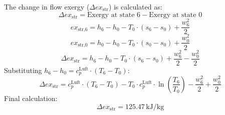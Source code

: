 The change in flow exergy (\( \Delta ex_\text{str} \)) is calculated as:  
\[ \Delta ex_\text{str} = \text{Exergy at state 6} - \text{Exergy at state 0} \]  
\[ ex_\text{str,6} = h_6 - h_0 - T_0 \cdot \left( s_6 - s_0 \right) + \frac{w_6^2}{2} \]  
\[ ex_\text{str,0} = h_0 - h_0 - T_0 \cdot \left( s_0 - s_0 \right) + \frac{w_0^2}{2} \]  
\[ \Delta ex_\text{str} = h_6 - h_0 - T_0 \cdot \left( s_6 - s_0 \right) + \frac{w_6^2}{2} - \frac{w_0^2}{2} \]  
Substituting \( h_6 - h_0 = c_p^\text{Luft} \cdot \left( T_6 - T_0 \right) \):  
\[ \Delta ex_\text{str} = c_p^\text{Luft} \cdot \left( T_6 - T_0 \right) - T_0 \cdot c_p^\text{Luft} \cdot \ln \left( \frac{T_6}{T_0} \right) - \frac{w_6^2}{2} + \frac{w_0^2}{2} \]  
Final calculation:  
\[ \Delta ex_\text{str} = 125.47 \, \text{kJ/kg} \]
